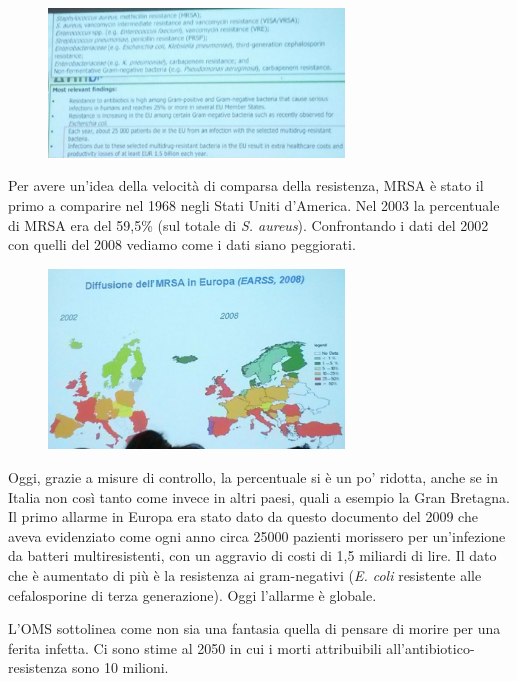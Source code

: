 \begin{figure}[!ht]
\centering
	\includegraphics[width=0.7\textwidth]{19/image5.jpeg}
	\end{figure}

Per
avere un'idea della velocità di comparsa della resistenza, MRSA è stato
il primo a comparire nel 1968 negli Stati Uniti d'America. Nel 2003 la
percentuale di MRSA era del 59,5\% (sul totale di \emph{S. aureus}).
Confrontando i dati del 2002 con quelli del 2008 vediamo come i dati
siano peggiorati.

\begin{figure}[!ht]
\centering
	\includegraphics[width=0.7\textwidth]{19/image6.jpeg}
	\end{figure}

Oggi,
grazie a misure di controllo, la percentuale si è un po' ridotta, anche
se in Italia non così tanto come invece in altri paesi, quali a esempio
la Gran Bretagna. Il primo allarme in Europa era stato dato da questo
documento del 2009 che aveva evidenziato come ogni anno circa 25000
pazienti morissero per un'infezione da batteri multiresistenti, con un
aggravio di costi di 1,5 miliardi di lire. Il dato che è aumentato di
più è la resistenza ai gram-negativi (\emph{E. coli} resistente alle
cefalosporine di terza generazione). Oggi l'allarme è globale.

L'OMS sottolinea come non sia una fantasia quella di pensare di morire
per una ferita infetta. Ci sono stime al 2050 in cui i morti
attribuibili all'antibiotico-resistenza sono 10 milioni.

